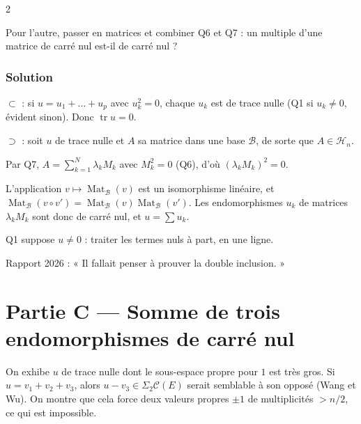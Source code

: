 \documentclass[11pt,a4paper]{article}
\newcommand{\equationajustee}[1]{%
  \sbox{\boiteequation}{$\displaystyle #1$}%
  \ifdim\wd\boiteequation>\linewidth
    \[\resizebox{\linewidth}{!}{\usebox{\boiteequation}}\]%
  \else
    \[#1\]%
  \fi}
\begin{document}
\begin{indication}{2}

Pour l'autre, passer en matrices et combiner Q6 et Q7 : un multiple d'une matrice de carré nul est-il de carré nul ?

\end{indication}

\hypertarget{solution-7}{%
\subsubsection{Solution}\label{solution-7}}

\(\subset\) : si \(u=u_1+\dots+u_p\) avec \(u_k^2=0\), chaque \(u_k\) est de trace nulle (Q1 si \(u_k\neq0\), évident sinon). Donc \(\operatorname{tr}u=0\).

\(\supset\) : soit \(u\) de trace nulle et \(A\) sa matrice dans une base \(\mathcal B\), de sorte que \(A\in\mathcal H_n\).

Par Q7, \(A=\sum_{k=1}^N\lambda_kM_k\) avec \(M_k^2=0\) (Q6), d'où \((\lambda_kM_k)^2=0\).

L'application \(v\mapsto\operatorname{Mat}_{\mathcal B}(v)\) est un isomorphisme linéaire, et \(\operatorname{Mat}_{\mathcal B}(v\circ v')=\operatorname{Mat}_{\mathcal B}(v)\operatorname{Mat}_{\mathcal B}(v')\). Les endomorphismes \(u_k\) de matrices \(\lambda_kM_k\) sont donc de carré nul, et \(u=\sum u_k\).

\equationajustee{\boxed{\Sigma_\infty\mathcal C(E)=\mathcal H(E).}}

\begin{piege}

Q1 suppose \(u\neq0\) : traiter les termes nuls à part, en une ligne.

\end{piege}

\begin{jury}

Rapport 2026 : « Il fallait penser à prouver la double inclusion. »

\end{jury}

\hypertarget{partie-c-somme-de-trois-endomorphismes-de-carruxe9-nul}{%
\section{Partie C --- Somme de trois endomorphismes de carré nul}\label{partie-c-somme-de-trois-endomorphismes-de-carruxe9-nul}}

On exhibe \(u\) de trace nulle dont le sous-espace propre pour \(1\) est très gros. Si \(u=v_1+v_2+v_3\), alors \(u-v_3\in\Sigma_2\mathcal C(E)\) serait semblable à son opposé (Wang et Wu). On montre que cela force deux valeurs propres \(\pm1\) de multiplicités \(>n/2\), ce qui est impossible.
\end{document}
